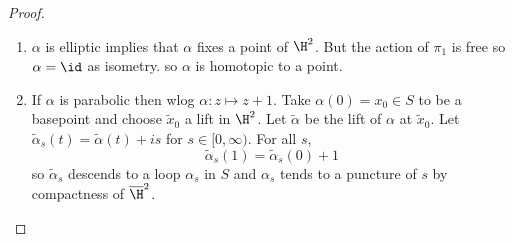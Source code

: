 \documentclass[a4paper]{article}
\begin{document}
\begin{proof}\leavevmode
  \begin{enumerate}
  \item \(\alpha\) is elliptic implies that \(\alpha\) fixes a point of \(\H^2\). But the action of \(\pi_1\) is free so \(\alpha = \id\) as isometry. so \(\alpha\) is homotopic to a point.
  \item If \(\alpha\) is parabolic then wlog \(\alpha: z \mapsto z + 1\). Take \(\alpha(0) = x_0 \in S\) to be a basepoint and choose \(\tilde x_0\) a lift in \(\H^2\). Let \(\tilde \alpha\) be the lift of \(\alpha\) at \(\tilde x_0\). Let \(\tilde \alpha_s(t) = \tilde \alpha(t) + is\) for \(s \in [0, \infty)\). For all \(s\),
    \[
      \tilde \alpha_s(1) = \tilde \alpha_s(0) + 1
    \]
    so \(\tilde \alpha_s\) descends to a loop \(\alpha_s\) in \(S\) and \(\alpha_s\) tends to a puncture of \(s\) by compactness of \(\overline \H^2\).
  \end{enumerate}
\end{proof}

















\printindex
\end{document}
